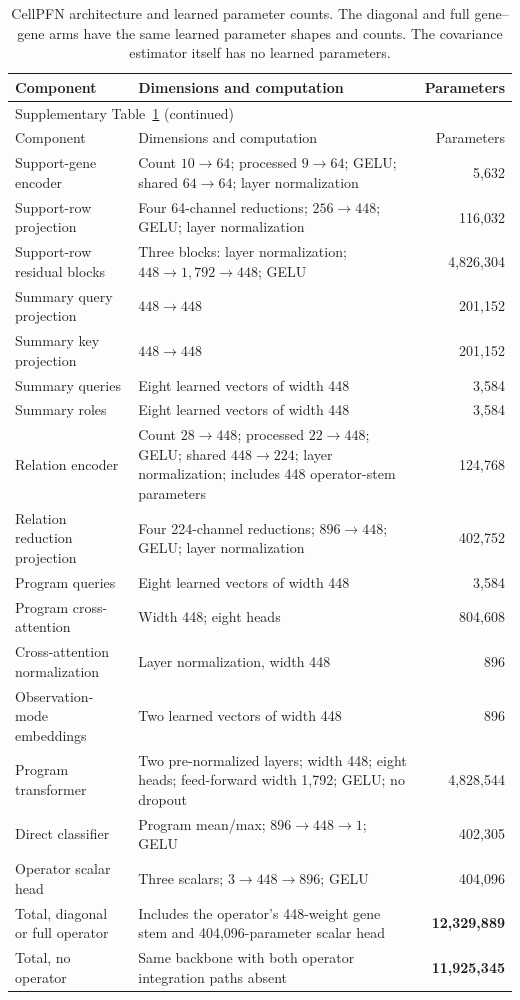 \begingroup
\small
\setlength{\tabcolsep}{4pt}
\renewcommand{\arraystretch}{1.12}
\begin{longtable}{p{}p{}r}
\caption{CellPFN architecture and learned parameter counts. The diagonal and full gene--gene arms have the same learned parameter shapes and counts. The covariance estimator itself has no learned parameters.}\label{tab:model-architecture}\\
\toprule
Component & Dimensions and computation & Parameters\\
\midrule
\endfirsthead
\multicolumn{3}{l}{Supplementary Table~\ref{tab:model-architecture} (continued)}\\
\toprule Component & Dimensions and computation & Parameters\\\midrule
\endhead
Support-gene encoder & Count $10\to64$; processed $9\to64$; GELU; shared $64\to64$; layer normalization & 5,632\\
Support-row projection & Four 64-channel reductions; $256\to448$; GELU; layer normalization & 116,032\\
Support-row residual blocks & Three blocks: layer normalization; $448\to1,792\to448$; GELU & 4,826,304\\
Summary query projection & $448\to448$ & 201,152\\
Summary key projection & $448\to448$ & 201,152\\
Summary queries & Eight learned vectors of width 448 & 3,584\\
Summary roles & Eight learned vectors of width 448 & 3,584\\
Relation encoder & Count $28\to448$; processed $22\to448$; GELU; shared $448\to224$; layer normalization; includes 448 operator-stem parameters & 124,768\\
Relation reduction projection & Four 224-channel reductions; $896\to448$; GELU; layer normalization & 402,752\\
Program queries & Eight learned vectors of width 448 & 3,584\\
Program cross-attention & Width 448; eight heads & 804,608\\
Cross-attention normalization & Layer normalization, width 448 & 896\\
Observation-mode embeddings & Two learned vectors of width 448 & 896\\
Program transformer & Two pre-normalized layers; width 448; eight heads; feed-forward width 1,792; GELU; no dropout & 4,828,544\\
Direct classifier & Program mean/max; $896\to448\to1$; GELU & 402,305\\
Operator scalar head & Three scalars; $3\to448\to896$; GELU & 404,096\\
\midrule
Total, diagonal or full operator & Includes the operator's 448-weight gene stem and 404,096-parameter scalar head & \textbf{12,329,889}\\
Total, no operator & Same backbone with both operator integration paths absent & \textbf{11,925,345}\\
\bottomrule
\end{longtable}
\endgroup

